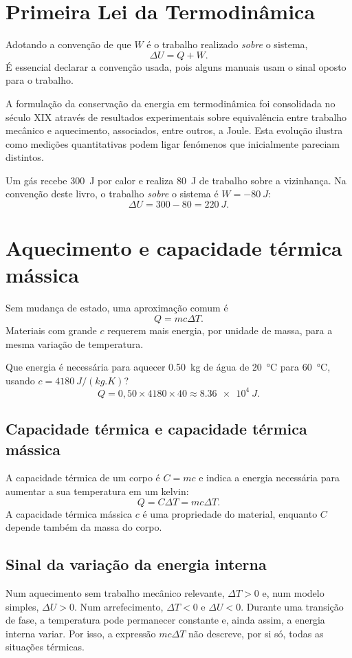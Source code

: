 \documentclass[11pt,a4paper,oneside]{book}
\begin{document}
\section{Primeira Lei da Termodinâmica}
Adotando a convenção de que $W$ é o trabalho realizado \textit{sobre} o sistema,
\[
\Delta U=Q+W.
\]
É essencial declarar a convenção usada, pois alguns manuais usam o sinal oposto para o trabalho.

A formulação da conservação da energia em termodinâmica foi consolidada no século XIX através de resultados experimentais sobre equivalência entre trabalho mecânico e aquecimento, associados, entre outros, a Joule. Esta evolução ilustra como medições quantitativas podem ligar fenómenos que inicialmente pareciam distintos.

\begin{exemplo}[title=Exemplo resolvido -- Primeira Lei]
Um gás recebe \SI{300}{J} por calor e realiza \SI{80}{J} de trabalho sobre a vizinhança. Na convenção deste livro, o trabalho \emph{sobre} o sistema é $W=-\SI{80}{J}$:
\[
\Delta U=300-80=\SI{220}{J}.
\]
\end{exemplo}

\section{Aquecimento e capacidade térmica mássica}
Sem mudança de estado, uma aproximação comum é
\[
Q=mc\Delta T.
\]
Materiais com grande $c$ requerem mais energia, por unidade de massa, para a mesma variação de temperatura.

\begin{exemplo}
Que energia é necessária para aquecer \SI{0.50}{kg} de água de \SI{20}{\celsius} para \SI{60}{\celsius}, usando $c=\SI{4180}{J/(kg.K)}$?
\[
Q=0{,}50\times4180\times40\approx\SI{8.36e4}{J}.
\]
\end{exemplo}

\subsection*{Capacidade térmica e capacidade térmica mássica}
A capacidade térmica de um corpo é $C=mc$ e indica a energia necessária para aumentar a sua temperatura em um kelvin:
\[
Q=C\Delta T=mc\Delta T.
\]
A capacidade térmica mássica $c$ é uma propriedade do material, enquanto $C$ depende também da massa do corpo.

\subsection*{Sinal da variação da energia interna}
Num aquecimento sem trabalho mecânico relevante, $\Delta T>0$ e, num modelo simples, $\Delta U>0$. Num arrefecimento, $\Delta T<0$ e $\Delta U<0$. Durante uma transição de fase, a temperatura pode permanecer constante e, ainda assim, a energia interna variar. Por isso, a expressão $mc\Delta T$ não descreve, por si só, todas as situações térmicas.
\end{document}
